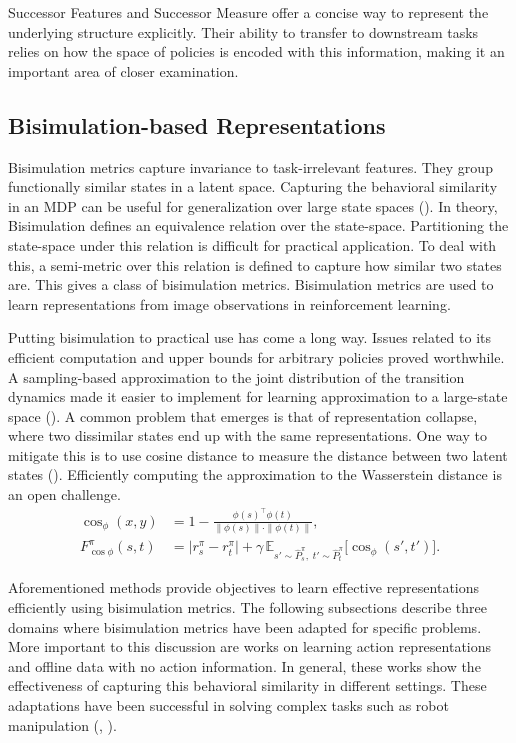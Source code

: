 \documentclass{article}
\begin{document}
Successor Features and Successor Measure offer a concise way to represent the underlying structure explicitly. Their ability to transfer to downstream tasks relies on how the space of policies is encoded with this information, making it an important area of closer examination. 


\subsection{Bisimulation-based Representations}
Bisimulation metrics capture invariance to task-irrelevant features. They group functionally similar states in a latent space. Capturing the behavioral similarity in an MDP can be useful for generalization over large state spaces (\cite{ferns2004metrics}). In theory, Bisimulation defines an equivalence relation over the state-space. Partitioning the state-space under this relation is difficult for practical application. To deal with this, a semi-metric over this relation is defined to capture how similar two states are. This gives a class of bisimulation metrics. Bisimulation metrics are used to learn representations from image observations in reinforcement learning.

Putting bisimulation to practical use has come a long way. Issues related to its efficient computation and upper bounds for arbitrary policies proved worthwhile. A sampling-based approximation to the joint distribution of the transition dynamics made it easier to implement for learning approximation to a large-state space (\cite{castro2021mico}). A common problem that emerges is that of representation collapse, where two dissimilar states end up with the same representations. One way to mitigate this is to use cosine distance to measure the distance between two latent states (\cite{zang2022simsr}). Efficiently computing the approximation to the Wasserstein distance is an open challenge.  
\begin{align}
\cos_{\phi}(x, y) 
&= 1 - \frac{\phi(s)^\top \phi(t)}
        {\|\phi(s)\| \cdot \|\phi(t)\|},
\label{eq:cosine} \\[1ex]
F^{\pi}_{\cos\phi}(s, t) 
&= \big| r^{\pi}_s - r^{\pi}_t \big|
   + \gamma \, \mathbb{E}_{s' \sim \hat{P}^{\pi}_s, \; t' \sim \hat{P}^{\pi}_t}
      \big[ \cos_{\phi}(s', t') \big].
\label{eq:simsr}
\end{align}

Aforementioned methods provide objectives to learn effective representations efficiently using bisimulation metrics. The following subsections describe three domains where bisimulation metrics have been adapted for specific problems. More important to this discussion are works on learning action representations and offline data with no action information. In general, these works show the effectiveness of capturing this behavioral similarity in different settings. These adaptations have been successful in solving complex tasks such as robot manipulation (\cite{hansen2022bisimulation}, \cite{shi2024self}). 
\end{document}
